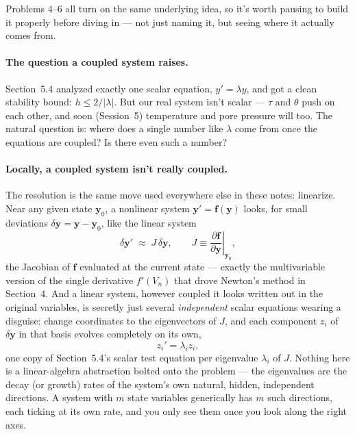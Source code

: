 Problems 4--6 all turn on the same underlying idea, so it's worth pausing to build it properly before diving in --- not just naming it, but seeing where it actually comes from.

\paragraph{The question a coupled system raises.} Section~5.4 analyzed exactly one scalar equation, $y'=\lambda y$, and got a clean stability bound: $h\le 2/|\lambda|$. But our real system isn't scalar --- $\tau$ and $\theta$ push on each other, and soon (Session~5) temperature and pore pressure will too. The natural question is: where does a single number like $\lambda$ come from once the equations are coupled? Is there even such a number?

\paragraph{Locally, a coupled system isn't really coupled.} The resolution is the same move used everywhere else in these notes: linearize. Near any given state $\mathbf y_0$, a nonlinear system $\mathbf y' = \mathbf f(\mathbf y)$ looks, for small deviations $\delta\mathbf y = \mathbf y - \mathbf y_0$, like the linear system
\begin{equation}
\delta\mathbf y' \;\approx\; J\,\delta\mathbf y, \qquad J \equiv \left.\frac{\partial \mathbf f}{\partial \mathbf y}\right|_{\mathbf y_0},
\end{equation}
the Jacobian of $\mathbf f$ evaluated at the current state --- exactly the multivariable version of the single derivative $f'(V_n)$ that drove Newton's method in Section~4. And a linear system, however coupled it looks written out in the original variables, is secretly just several \emph{independent} scalar equations wearing a disguise: change coordinates to the eigenvectors of $J$, and each component $z_i$ of $\delta\mathbf y$ in that basis evolves completely on its own,
\begin{equation}
z_i' = \lambda_i z_i,
\end{equation}
one copy of Section~5.4's scalar test equation per eigenvalue $\lambda_i$ of $J$. Nothing here is a linear-algebra abstraction bolted onto the problem --- the eigenvalues are the decay (or growth) rates of the system's own natural, hidden, independent directions. A system with $m$ state variables generically has $m$ such directions, each ticking at its own rate, and you only see them once you look along the right axes.

